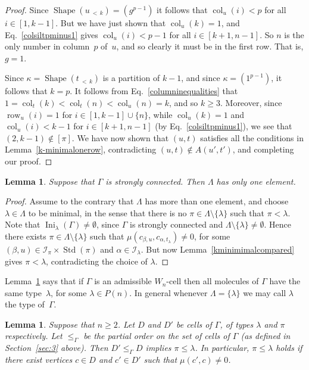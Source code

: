 \documentclass[10pt]{amsart}
\newtheorem{lemm}[theo]{Lemma}
\theoremstyle{definition}
\DeclareMathOperator{\Ini}{Ini}
\DeclareMathOperator{\row}{row}
\DeclareMathOperator{\col}{col}
\newcommand{\lessthan}[2]{#1\,{_{<\,#2}}}
\DeclareMathOperator{\STD}{Std}
\DeclareMathOperator{\shape}{Shape}
\begin{document}
\begin{proof}
Since $\shape(\lessthan uk)=(g^{p-1})$ it follows that $\col_u(i)<p$ for
all $i\in[1,k-1]$. But we have just shown that $\col_u(k)=1$, and
Eq.~\eqref{colsiltpminus1} gives $\col_u(i)<p-1$ for all $i\in[k+1,n-1]$.
So $n$ is the only number in column~$p$ of~$u$, and so clearly it
must be in the first row. That is, $g=1$.

Since $\kappa=\shape(\lessthan tk)$ is a partition of $k-1$, and since $\kappa=(1^{p-1})$,
it follows that $k=p$. It follows from Eq.~\eqref{columninequalities} that
$1=\col_t(k)<\col_t(n)<\col_u(n)=k$, and so $k\geqslant 3$. Moreover,
since $\row_u(i)=1$ for $i\in[1,k-1]\cup\{n\}$, while $\col_u(k)=1$
and $\col_u(i)<k-1$ for $i\in[k+1,n-1]$ (by Eq.~\eqref{colsiltpminus1}),
we see that $(2,k-1)\notin [\pi]$. We have now shown that $(u,t)$
satisfies all the conditions in Lemma~\ref{k-minimalonerow}, contradicting
$(u,t)\notin A(u',t')$, and completing our proof.
\end{proof}

\begin{lemm}\label{samelambda}
Suppose that $\Gamma$ is strongly connected. Then $\Lambda$ has only one element.
\end{lemm}

\begin{proof}
Assume to the contrary that $\Lambda$ has more than one element, and
choose $\lambda\in\Lambda$ to be minimal, in the sense that there is no
$\pi\in\Lambda\setminus\{\lambda\}$ such that $\pi<\lambda$. Note that
$\Ini_{\lambda}(\Gamma)\neq\emptyset$, since
$\Gamma$ is strongly connected and $\Lambda\setminus\{\lambda\}\ne\emptyset$.
Hence there exists $\pi\in\Lambda\setminus\{\lambda\}$ such that
$\mu(c_{\beta,u},c_{\alpha,t_{\lambda}})\neq 0$,
for some $(\beta,u)\in\mathcal{I}_{\pi}\times\STD(\pi)$ and
$\alpha\in\mathcal{I}_{\lambda}$. But now Lemma~\ref{kminimimalcompared}
gives $\pi<\lambda$, contradicting the choice of $\lambda$.
\end{proof}
Lemma~\ref{samelambda} says that if $\Gamma$ is an admissible $W_n$-cell
then all molecules of $\Gamma$ have the same type~$\lambda$, for some
$\lambda\in P(n)$. In general whenever $\Lambda=\{\lambda\}$ we may
call $\lambda$ the type of~$\Gamma$.

\begin{lemm}\label{muandnucells}
Suppose that $n\geqslant 2$. Let $D$ and $D'$ be cells of $\Gamma$,
of types $\lambda$ and $\pi$ respectively. Let $\leqslant_\Gamma$
be the partial order on the set of cells of $\Gamma$ (as defined in
Section~\ref{sec:3} above).
Then $D'\leqslant_{\Gamma} D$ implies $\pi\leqslant\lambda$. In particular,
$\pi\leqslant\lambda$ holds if there exist vertices $c\in D$ and $c'\in D'$
such that $\mu(c',c) \neq 0$.
\end{lemm}
\end{document}
